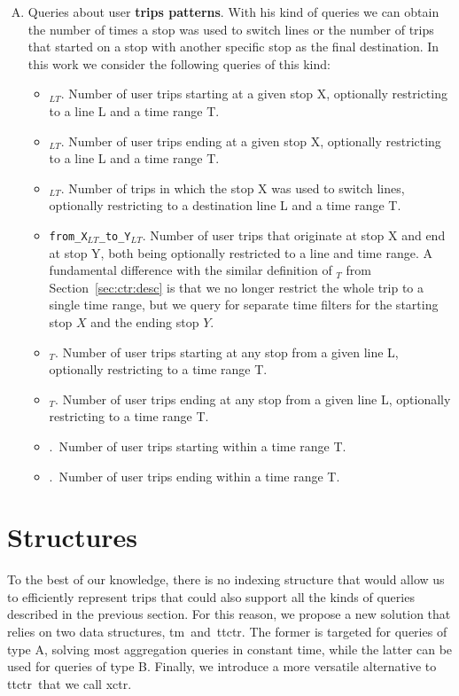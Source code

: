 \begin{enumerate}[A)]
        \item Queries about user \textbf{trips patterns}. With his kind of queries we can obtain the number of times a stop was used to switch lines or the number of trips that started on a stop with another specific stop as the final destination. In this work we consider the following queries of this kind:
        \begin{itemize}
            \item \startX$_{LT}$. Number of user trips starting at a given stop X, optionally restricting to a line L and a time range T.
            \item \endX$_{LT}$. Number of user trips ending at a given stop X, optionally restricting to a line L and a time range T.
            \item \switchX$_{LT}$. Number of trips in which the stop X was used to switch lines, optionally restricting to a destination line L and a time range T.
            \item \texttt{from\_X$_{LT}$\_to\_Y$_{LT}$}. Number of user trips that originate at stop X and end at stop Y, both being optionally restricted to a line and time range. A fundamental difference with the similar definition of \XtoY$_T$ from Section~\ref{sec:ctr:desc} is that we no longer restrict the whole trip to a single time range, but we query for separate time filters for the starting stop $X$ and the ending stop $Y$.
            \item \startL$_T$. Number of user trips starting at any stop from a given line L, optionally restricting to a time range T.
            \item \endL$_T$. Number of user trips ending at any stop from a given line L, optionally restricting to a time range T.
            \item \startT.~Number of user trips starting within a time range T.
            \item \endT.~Number of user trips ending within a time range T.
        \end{itemize}
    \end{enumerate}
	
\section{Structures}
\label{sec:newctr:str}
    To the best of our knowledge, there is no indexing structure that would allow us to efficiently represent trips that could also support all the kinds of queries described in the previous section. For this reason, we propose a new solution that relies on two data structures, \gls{tm}~and~\gls{ttctr}. The former is targeted for queries of type A, solving most aggregation queries in constant time, while the latter can be used for queries of type B. Finally, we introduce a more versatile alternative to \gls{ttctr}~that we call \gls{xctr}.
    
